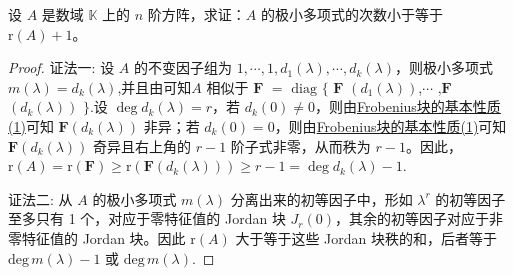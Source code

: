 \documentclass[../../main.tex]{subfiles}
\begin{document}
\begin{proposition}\label{proposition:极小多项式的次数小于等于矩阵的秩加1}
设 $A$ 是数域 $\mathbb{K}$ 上的 $n$ 阶方阵，求证：$A$ 的极小多项式的次数小于等于 $\mathrm{r}(A)+1$。
\end{proposition}
\begin{proof}
{\color{blue}证法一:}
设 $A$ 的不变因子组为 $1,\cdots,1,d_1(\lambda),\cdots,d_k(\lambda)$，则极小多项式 $m(\lambda)=d_k(\lambda)$,并且由可知$A$ 相似于 $\boldsymbol{F}$ $=$ $\mathrm{diag}$ $\{$ $\boldsymbol{F}$ $(d_1(\lambda))$,$\cdots$ ,$\boldsymbol{F}$ $(d_k(\lambda))$ $\}$.设 $\deg d_k(\lambda)=r$，若 $d_k(0)\neq 0$，则由\hyperref[lemma:Frobenius标准型矩阵的极小多项式和不变因子]{Frobenius块的基本性质(1)}可知 $\boldsymbol{F}(d_k(\lambda))$ 非异；若 $d_k(0)=0$，则由\hyperref[lemma:Frobenius标准型矩阵的极小多项式和不变因子]{Frobenius块的基本性质(1)}可知 $\boldsymbol{F}(d_k(\lambda))$ 奇异且右上角的 $r - 1$ 阶子式非零，从而秩为 $r - 1$。因此，$\mathrm{r}(A)=\mathrm{r}(\boldsymbol{F})\geq\mathrm{r}(\boldsymbol{F}(d_k(\lambda)))\geq r - 1=\deg d_k(\lambda)-1$.

{\color{blue}证法二:}
从 $A$ 的极小多项式 $m(\lambda)$ 分离出来的初等因子中，形如 $\lambda^r$ 的初等因子至多只有 1 个，对应于零特征值的 Jordan 块 $J_r(0)$，其余的初等因子对应于非零特征值的 Jordan 块。因此 $\mathrm{r}(A)$ 大于等于这些 Jordan 块秩的和，后者等于 $\mathrm{deg}\,m(\lambda) - 1$ 或 $\mathrm{deg}\,m(\lambda)$.
\end{proof}
\end{document}
